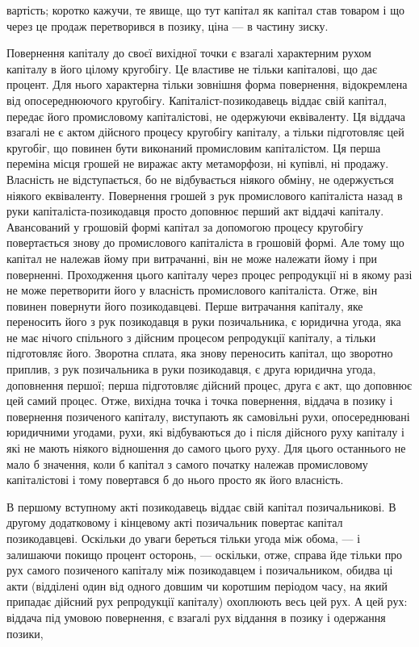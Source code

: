 \parcont{}  %
вартість; коротко кажучи, те явище, що тут капітал як капітал
став товаром і що через це продаж перетворився в позику,
ціна — в частину зиску.

Повернення капіталу до своєї вихідної точки є взагалі характерним
рухом капіталу в його цілому кругобігу. Це властиве
не тільки капіталові, що дає процент. Для нього характерна
тільки зовнішня форма повернення, відокремлена від опосереднюючого
кругобігу. Капіталіст-позикодавець віддає свій
капітал, передає його промисловому капіталістові, не одержуючи
еквіваленту. Ця віддача взагалі не є актом дійсного процесу
кругобігу капіталу, а тільки підготовляє цей кругобіг, що повинен
бути виконаний промисловим капіталістом. Ця перша переміна
місця грошей не виражає акту метаморфози, ні купівлі, ні
продажу. Власність не відступається, бо не відбувається ніякого
обміну, не одержується ніякого еквіваленту. Повернення грошей
з рук промислового капіталіста назад в руки капіталіста-позикодавця
просто доповнює перший акт віддачі капіталу. Авансований
у грошовій формі капітал за допомогою процесу кругобігу
повертається знову до промислового капіталіста в грошовій
формі. Але тому що капітал не належав йому при витрачанні,
він не може належати йому і при поверненні. Проходження
цього капіталу через процес репродукції ні в якому разі не
може перетворити його у власність промислового капіталіста.
Отже, він повинен повернути його позикодавцеві. Перше витрачання
капіталу, яке переносить його з рук позикодавця в руки позичальника,
є юридична угода, яка не має нічого спільного з дійсним
процесом репродукції капіталу, а тільки підготовляє його.
Зворотна сплата, яка знову переносить капітал, що зворотно
приплив, з рук позичальника в руки позикодавця, є друга юридична
угода, доповнення першої; перша підготовляє дійсний
процес, друга є акт, що доповнює цей самий процес. Отже,
вихідна точка і точка повернення, віддача в позику і повернення
позиченого капіталу, виступають як самовільні рухи, опосереднювані
юридичними угодами, рухи, які відбуваються до і після
дійсного руху капіталу і які не мають ніякого відношення до самого
цього руху. Для цього останнього не мало б значення,
коли б капітал з самого початку належав промисловому капіталістові
і тому повертався б до нього просто як його власність.

В першому вступному акті позикодавець віддає свій капітал
позичальникові. В другому додатковому і кінцевому акті позичальник
повертає капітал позикодавцеві. Оскільки до уваги береться
тільки угода між обома, — і залишаючи покищо процент
осторонь, — оскільки, отже, справа йде тільки про рух самого
позиченого капіталу між позикодавцем і позичальником, обидва
ці акти (відділені один від одного довшим чи коротшим періодом
часу, на який припадає дійсний рух репродукції капіталу)
охоплюють весь цей рух. А цей рух: віддача під умовою повернення,
є взагалі рух віддання в позику і одержання позики,
\parbreak{}  %
